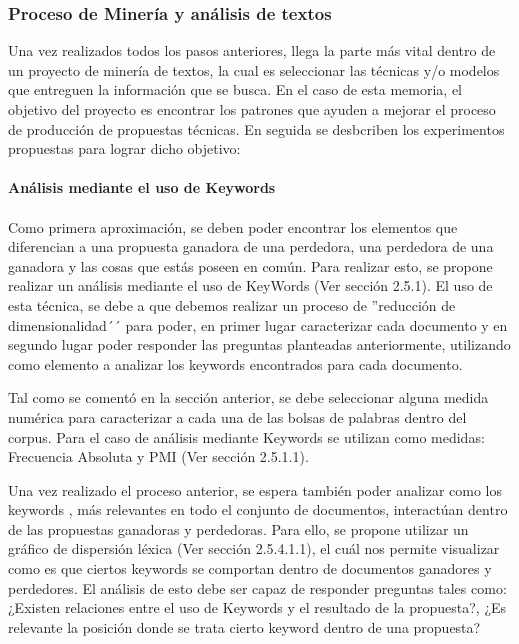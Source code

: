     
\subsubsection{Proceso de Minería y análisis de textos}
    Una vez realizados todos los pasos anteriores, llega la parte más vital dentro de un proyecto de minería de textos, la cual es seleccionar las técnicas y/o modelos que entreguen la información que se busca. En el caso de esta memoria, el objetivo del proyecto es encontrar los patrones que ayuden a mejorar el proceso de producción de propuestas técnicas. En seguida se desbcriben los experimentos propuestas para lograr dicho objetivo:

    \paragraph{Análisis mediante el uso de Keywords}
    \paragraph*{}
    Como primera aproximación, se deben poder encontrar los elementos que diferencian a una propuesta ganadora de una perdedora, una perdedora de una ganadora y las cosas que estás poseen en común. Para realizar esto, se propone realizar un análisis mediante el uso de KeyWords (Ver sección 2.5.1). El uso de esta técnica, se debe a que debemos realizar un proceso de ''reducción de dimensionalidad´´ para poder, en primer lugar caracterizar cada documento y en segundo lugar poder responder las preguntas planteadas anteriormente, utilizando como elemento a analizar los keywords encontrados para cada documento.  
     
    Tal como se comentó en la sección anterior, se debe seleccionar alguna medida numérica para caracterizar a cada una de las bolsas de palabras dentro del corpus. Para el caso de análisis mediante Keywords se utilizan como medidas: Frecuencia Absoluta y PMI (Ver sección 2.5.1.1).
    
    Una vez realizado el proceso anterior, se espera también poder analizar como los keywords , más relevantes en todo el conjunto de documentos, interactúan dentro de las propuestas ganadoras y perdedoras. Para ello, se propone utilizar un gráfico de dispersión léxica (Ver sección 2.5.4.1.1), el cuál nos permite visualizar como es que ciertos keywords se comportan dentro de documentos ganadores y perdedores. El análisis de esto debe ser capaz de responder preguntas tales como: ¿Existen relaciones entre el uso de Keywords y el resultado de la propuesta?, ¿Es relevante la posición donde se trata cierto keyword dentro de una propuesta?
     
